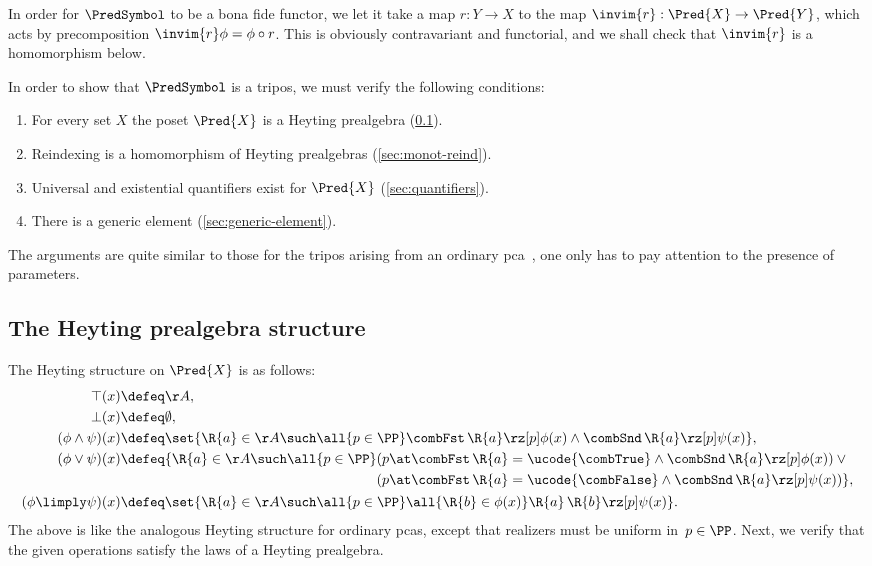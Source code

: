 In order for $\PredSymbol$ to be a bona fide functor, we let it take a map $r : Y \to X$ to the  map $\invim{r} : \Pred{X} \to \Pred{Y}$, which acts by precomposition $\invim{r} \phi = \phi \circ r$. This is obviously contravariant and functorial, and we shall check that $\invim{r}$ is a homomorphism below.

In order to show that $\PredSymbol$ is a tripos, we must verify the following conditions:
%
\begin{enumerate}
\item For every set $X$ the poset $\Pred{X}$ is a Heyting prealgebra (\cref{sec:heyt-prealg-struct}).
\item Reindexing is a homomorphism of Heyting prealgebras (\cref{sec:monot-reind}).
\item Universal and existential quantifiers exist for $\Pred{X}$ (\cref{sec:quantifiers}).
\item There is a generic element (\cref{sec:generic-element}).
\end{enumerate}
%
The arguments are quite similar to those for the tripos arising from an ordinary pca~\cite[Prop.~1.2.1]{oosten08:_realiz}, one only has to pay attention to the presence of parameters.

\subsection{The Heyting prealgebra structure}
\label{sec:heyt-prealg-struct}

The Heyting structure on $\Pred{X}$ is as follows:
%
{\allowdisplaybreaks
\begin{align*}
  \top(x) &\defeq \AA,\\
  \bot(x) &\defeq \emptyset,\\
  (\phi \land \psi)(x) &\defeq \set{\R{a} \in \AA \such
      \all{p \in \PP}
      \combFst \, \R{a} \rz[p] \phi(x) \land
      \combSnd \, \R{a} \rz[p] \psi(x)
  },
  \\
  (\phi \lor \psi)(x) &\defeq \{\R{a} \in \AA \such
    \all{p \in \PP}
    \begin{aligned}[t]
    &(p \at \combFst \, \R{a} = \ucode{\combTrue} \land \combSnd \, \R{a} \rz[p] \phi(x))
    \lor {} \\
    &(p \at \combFst \, \R{a} = \ucode{\combFalse} \land \combSnd \, \R{a} \rz[p] \psi(x)) \},
    \end{aligned}
  \\
  (\phi \limply \psi)(x) &\defeq \set{\R{a} \in \AA \such
    \all{p \in \PP} \all{\R{b} \in \phi(x)} \R{a} \, \R{b} \rz[p] \psi(x)}.
\end{align*}
}
%
The above is like the analogous Heyting structure for ordinary pcas, except that realizers must be uniform in~$p \in \PP$. Next, we verify that the given operations satisfy the laws of a Heyting prealgebra.

